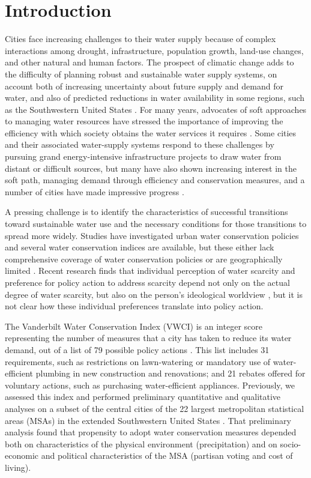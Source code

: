 \documentclass[draft,linenumbers]{agujournal}
\begin{document}
\section{Introduction}
Cities face increasing challenges to their water supply because of complex
interactions among drought, infrastructure, population growth, land-use changes,
and other natural and human factors.
The prospect of climatic change adds to the difficulty of planning robust and
sustainable water supply systems, on account both of  increasing uncertainty
about future supply and demand for water, and also of predicted reductions in
water availability in some regions, such as the Southwestern United States
\citep{gcrp:natl.assessment.3:2014}.
For many years, advocates of soft approaches to managing water resources have
stressed the importance of improving  the efficiency with which society obtains
the water services it requires  \citep{gleick:soft.water.paths:2002}.
Some cities and their associated water-supply systems respond to these
challenges by pursuing grand energy-intensive infrastructure projects to draw
water from distant or difficult sources, but many have also shown increasing
interest in the soft path, managing demand through efficiency and conservation
measures, and a number of cities have made impressive progress
\citep{fleck:fighting:2016}.

A pressing challenge is to identify the characteristics of successful
transitions toward sustainable water use and the necessary conditions for those
transitions to spread more widely.
Studies have investigated urban water conservation policies and several water
conservation indices are available, but these either lack comprehensive coverage
of water conservation policies or are geographically limited
\citep{hess:vwci:2017,sauri:conservation:2013,maggioni:conservation:2014}.
Recent research finds that individual perception of water scarcity and
preference for policy action to address scarcity depend not only on the actual
degree of water scarcity, but also on the person's ideological worldview
\citep{switzer:green.lenses:2016}, but it is not clear how these individual
preferences translate into policy action.

The Vanderbilt Water Conservation Index (VWCI) is an integer score representing
the number of measures that a city has taken to reduce its water demand, out of
a list of 79 possible policy actions
\citep{hornberger:hydrological.transitions:2015,hess:drought:2016,hess:vwci:2017}.
This list includes 31 requirements, such as restrictions on
lawn-watering or mandatory use of water-efficient plumbing in new construction
and renovations; and 21 rebates offered for voluntary actions, such
as purchasing water-efficient appliances.
Previously, we assessed this index and performed preliminary quantitative and
qualitative analyses on a subset of the central cities of the 22 largest
metropolitan statistical areas (MSAs) in the extended Southwestern United States
\citep{hess:drought:2016}.
That preliminary analysis found that propensity to
adopt water conservation measures depended both on characteristics
of the physical environment (precipitation) and on socio-economic and political
characteristics of the MSA (partisan voting and cost of living).
\end{document}
